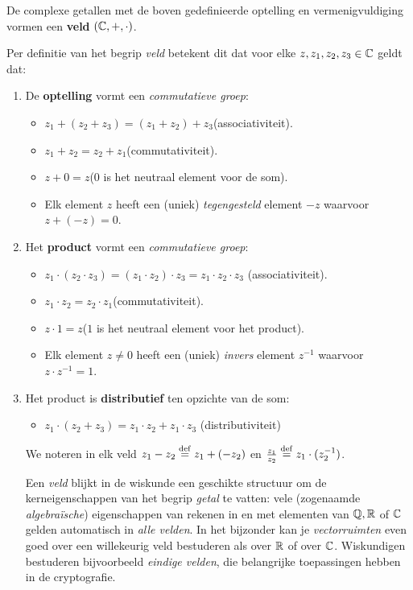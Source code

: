 \documentclass{ximera}
\begin{document}
\begin{xmuitweiding} \label{uitw:veld}\nl 
	
De complexe getallen met de boven gedefinieerde optelling en vermenigvuldiging vormen een \textbf{veld} $(\mathbb{C},+,\cdot)$.

Per definitie van het begrip \textit{veld} betekent dit dat voor elke $z,z_1,z_2,z_3\in \mathbb{C}$ geldt dat:
\begin{enumerate}
 \item De \textbf{optelling} vormt een \textit{commutatieve groep}: 
 \begin{itemize}
   \item $z_1+(z_2+z_3)=(z_1+z_2)+z_3$\hfill (associativiteit).
   \item $z_1+z_2=z_2+z_1$\hfill (commutativiteit).
   \item $z+0=z$\hfill  ($0$ is het neutraal element voor de som).
   \item Elk element $z$ heeft een (uniek) \textit{tegengesteld} element $-z$ waarvoor $z+(-z)=0$. 
 \end{itemize}

 \item Het \textbf{product} vormt een \textit{commutatieve groep}: 
 \begin{itemize}
   \item $z_1\cdot(z_2\cdot z_3)=(z_1\cdot z_2)\cdot z_3=z_1\cdot z_2\cdot z_3$ \hfill  (associativiteit).
   \item $z_1\cdot z_2=z_2\cdot z_1$\hfill (commutativiteit).
   \item $z\cdot 1=z$\hfill ($1$ is het neutraal element voor het product).
   \item Elk element $z\not= 0$ heeft een (uniek) \textit{invers} element $z^{-1}$ waarvoor $z \cdot z^{-1} = 1$.
 \end{itemize}

 \item Het product is \textbf{distributief} ten opzichte van de som: 
 \begin{itemize}
   \item $z_1\cdot(z_2+z_3)=z_1\cdot z_2+z_1\cdot z_3$  \hfill(distributiviteit)
 \end{itemize}

  We noteren in elk veld  $z_1-z_2 \overset{\mathrm{def}}{=} z_1+(-z_2)$ en $\frac{z_1}{z_2} \overset{\mathrm{def}}{=} z_1\cdot(z_2^{-1})$.

  Een \textit{veld} blijkt in de wiskunde een geschikte structuur om de kerneigenschappen van het begrip \textit{getal} te vatten: vele (zogenaamde \textit{algebraïsche}) eigenschappen van rekenen in en met elementen van $\mathbb{Q},\mathbb{R}$ of $\mathbb{C}$ gelden automatisch in \textit{alle velden}. In het bijzonder kan je \textit{vectorruimten} even goed over een willekeurig veld bestuderen als over $\mathbb{R}$ of over $\mathbb{C}$. Wiskundigen bestuderen bijvoorbeeld \textit{eindige velden}, die belangrijke toepassingen hebben in de cryptografie. 
\end{enumerate}
\end{xmuitweiding}
\end{document}
